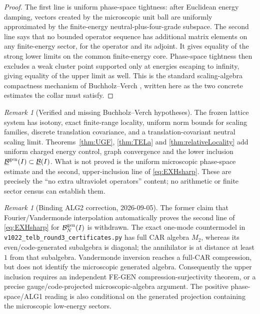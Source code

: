\documentclass[11pt]{article}
\theoremstyle{remark}
\newtheorem{remark}[theorem]{Remark}
\newcommand{\B}{\mathcal B}
\begin{document}
\begin{proof}
The first line is uniform phase-space tightness: after Euclidean energy
damping, vectors created by the microscopic unit ball are uniformly
approximated by the finite-energy neutral-plus-four-grade subspace.  The
second line says that no bounded operator sequence has additional
matrix elements on any finite-energy sector, for the operator and its
adjoint.  It gives equality of the strong lower limits on the common
finite-energy core.  Phase-space tightness then excludes a weak cluster
point supported only at energies escaping to infinity, giving equality
of the upper limit as well.  This is the standard scaling-algebra
compactness mechanism of Buchholz--Verch \cite{BuchholzVerch}, written
here as the two concrete estimates the collar must satisfy.
\end{proof}

\begin{remark}[Verified and missing Buchholz--Verch hypotheses]
The frozen lattice system has isotony, exact finite-range locality,
uniform norm bounds for scaling families, discrete translation
covariance, and a translation-covariant neutral scaling limit.
Theorems~\ref{thm:UGF}, \ref{thm:TELa} and
\ref{thm:relativeLocality} add uniform charged energy control, graph
convergence and the lower inclusion
$\underline{\B}^{\rm gen}(I)\subset\underline{\B}(I)$.  What is not
proved is the uniform microscopic phase-space estimate and the second,
upper-inclusion line of \eqref{eq:EXHsharp}.  These are precisely the
``no extra ultraviolet operators'' content; no arithmetic or finite
sector census can establish them.
\end{remark}

\begin{remark}[Binding ALG2 correction, 2026-09-05]
The former claim that Fourier/Vandermonde interpolation automatically proves
the second line of \eqref{eq:EXHsharp} for
$\B_N^{\rm gen}(I)$ is withdrawn.  The exact one-mode countermodel in
\texttt{v1022\_telb\_round3\_certificates.py} has full CAR algebra $M_2$,
whereas its even/code-generated subalgebra is diagonal; the annihilator is at
distance at least $1$ from that subalgebra.  Vandermonde inversion reaches a
full-CAR compression, but does not identify the microscopic generated algebra.
Consequently the upper inclusion requires an independent FE-GEN
compression-surjectivity theorem, or a precise gauge/code-projected
microscopic-algebra argument.  The positive phase-space/ALG1 reading is also
conditional on the generated projection containing the microscopic
low-energy sectors.
\end{remark}
\end{document}
